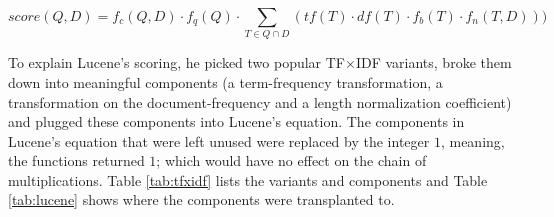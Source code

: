 \begin{equation}
  score(Q,D) = f_{c}(Q,D) \cdot f_{q}(Q) \cdot \displaystyle\sum_{T \in Q \cap D}(tf(T) \cdot df(T) \cdot f_{b}(T) \cdot f_{n}(T,D)))
  \label{eqn:Lucene-scoring-generalized}
\end{equation}

To explain Lucene's scoring, he picked two popular TF$\times$IDF
variants, broke them down into meaningful components (a term-frequency
transformation, a transformation on the document-frequency and a
length normalization coefficient) and plugged these components into
Lucene's equation. The components in Lucene's equation that were left
unused were replaced by the integer $1$, meaning, the functions
returned $1$; which would have no effect on the chain of
multiplications. Table \ref{tab:tfxidf} lists the variants and
components and Table \ref{tab:lucene} shows where the components were
transplanted to.

